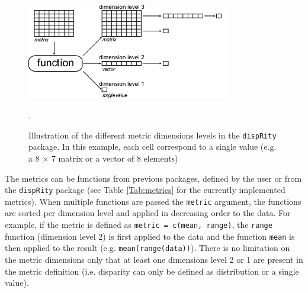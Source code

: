 \documentclass[12pt,letterpaper]{article}
\newcommand{\disp}{\texttt{dispRity} }
\begin{document}
\begin{figure}[!htbp]
\centering
   \includegraphics[width=0.8\textwidth]{../inst/gitbook/dispRity_fun.pdf} 
\caption{Illustration of the different metric dimensions levels in the \disp package. In this example, each cell correspond to a single value (e.g. a 8 $\times$ 7 matrix or a vector of 8 elements)}.
\label{Fig:levels}
\end{figure}

The metrics can be functions from previous packages, defined by the user or from the \disp package (see Table \ref{Tab:metrics} for the currently implemented metrics).
When multiple functions are passed the \texttt{metric} argument, the functions are sorted per dimension level and applied in decreasing order to the data.
For example, if the metric is defined as \texttt{metric = c(mean, range)}, the \texttt{range} function (dimension level 2) is first applied to the data and the function \texttt{mean} is then applied to the result (e.g. \texttt{mean(range(data))}).
There is no limitation on the metric dimensions only that at least one dimensions level 2 or 1 are present in the metric definition (i.e. disparity can only be defined as distribution or a single value).
\end{document}
